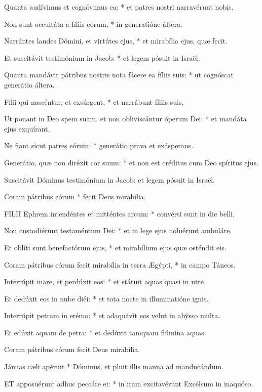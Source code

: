 Quanta audívimus et cognóvimus ea: * et patres nostri narravérunt nobis.

Non sunt occultáta a fíliis eórum, * in generatióne áltera.

Narrántes laudes Dómini, et virtútes ejus, * et mirabília ejus, quæ fecit.

Et suscitávit testimónium in Jacob: * et legem pósuit in Israël.

Quanta mandávit pátribus nostris nota fácere ea fíliis suis: * ut cognóscat generátio áltera.

Fílii qui nascéntur, et exsúrgent, * et narrábunt fíliis suis,

Ut ponant in Deo spem suam, et non obliviscántur óperum Dei: * et mandáta ejus exquírant.

Ne fiant sicut patres eórum: * generátio prava et exásperans.

Generátio, quæ non diréxit cor suum: * et non est créditus cum Deo spíritus ejus.

 Suscitávit Dóminus testimónium in Jacob: et legem pósuit in Israël.

 Coram pátribus eórum * fecit Deus mirabília.


\lettrine[lines=2]{F}{ILII} Ephrem intendéntes et mitténtes arcum: * convérsi sunt in die belli.

Non custodiérunt testaméntum Dei: * et in lege ejus noluérunt ambuláre.

Et oblíti sunt benefactórum ejus, * et mirabílium ejus quæ osténdit eis.

Coram pátribus eórum fecit mirabília in terra Ægýpti, * in campo Táneos.

Interrúpit mare, et perdúxit eos: * et státuit aquas quasi in utre.

Et dedúxit eos in nube diéi: * et tota nocte in illuminatióne ignis.

Interrúpit petram in erémo: * et adaquávit eos velut in abýsso multa.

Et edúxit aquam de petra: * et dedúxit tamquam flúmina aquas.

 Coram pátribus eórum fecit Deus mirabília.

 Jánuas cæli apéruit * Dóminus, et pluit illis manna ad manducándum.


\lettrine[lines=2]{E}{T} apposuérunt adhuc peccáre ei: * in iram excitavérunt Excélsum in inaquóso.

